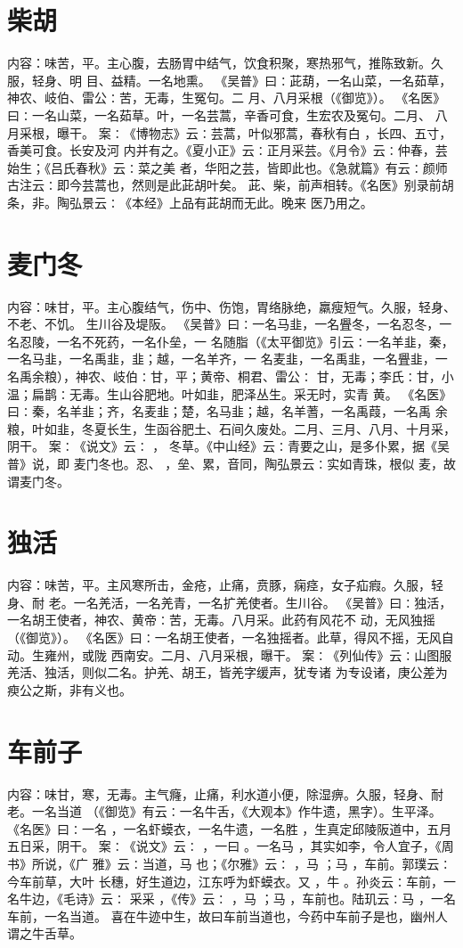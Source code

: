 \documentclass[12pt,UTF8]{ctexbook}
\begin{document}
\section{柴胡}
内容：味苦，平。主心腹，去肠胃中结气，饮食积聚，寒热邪气，推陈致新。久服，轻身、明 
目、益精。一名地熏。 
《吴普》曰∶茈葫，一名山菜，一名茹草，神农、岐伯、雷公∶苦，无毒，生冤句。二 
月、八月采根（《御览》）。 
《名医》曰∶一名山菜，一名茹草。叶，一名芸蒿，辛香可食，生宏农及冤句。二月、 
八月采根，曝干。 
案∶《博物志》云∶芸蒿，叶似邪蒿，春秋有白 ，长四、五寸，香美可食。长安及河 
内并有之。《夏小正》云∶正月采芸。《月令》云∶仲春，芸始生；《吕氏春秋》云∶菜之美 
者，华阳之芸，皆即此也。《急就篇》有云∶颜师古注云∶即今芸蒿也，然则是此茈胡叶矣。 
茈、柴，前声相转。《名医》别录前胡条，非。陶弘景云∶《本经》上品有茈胡而无此。晚来 
医乃用之。 


\section{麦门冬}
内容：味甘，平。主心腹结气，伤中、伤饱，胃络脉绝，羸瘦短气。久服，轻身、不老、不饥。 
生川谷及堤阪。 
《吴普》曰∶一名马韭，一名舋冬，一名忍冬，一名忍陵，一名不死药，一名仆垒，一 
名随脂（《太平御览》引云∶一名羊韭，秦，一名马韭，一名禹韭，韭；越，一名羊齐，一 
名麦韭，一名禹韭，一名舋韭，一名禹余粮），神农、岐伯∶甘，平；黄帝、桐君、雷公∶ 
甘，无毒；李氏∶甘，小温；扁鹊∶无毒。生山谷肥地。叶如韭，肥泽丛生。采无时，实青 
黄。 
《名医》曰∶秦，名羊韭；齐，名麦韭；楚，名马韭；越，名羊蓍，一名禹葭，一名禹 
余粮，叶如韭，冬夏长生，生函谷肥土、石间久废处。二月、三月、八月、十月采，阴干。 
案∶《说文》云∶ ， 冬草。《中山经》云∶青要之山，是多仆累，据《吴普》说，即 
麦门冬也。忍、 ，垒、累，音同，陶弘景云∶实如青珠，根似 麦，故谓麦门冬。 


\section{独活}
内容：味苦，平。主风寒所击，金疮，止痛，贲豚，痫痉，女子疝瘕。久服，轻身、耐 
老。一名羌活，一名羌青，一名扩羌使者。生川谷。 
《吴普》曰∶独活，一名胡王使者，神农、黄帝∶苦，无毒。八月采。此药有风花不 
动，无风独摇（《御览》）。 
《名医》曰∶一名胡王使者，一名独摇者。此草，得风不摇，无风自动。生雍州，或陇 
西南安。二月、八月采根，曝干。 
案∶《列仙传》云∶山图服羌活、独活，则似二名。护羌、胡王，皆羌字缓声，犹专诸 
为专设诸，庚公差为瘐公之斯，非有义也。 


\section{车前子}
内容：味甘，寒，无毒。主气癃，止痛，利水道小便，除湿痹。久服，轻身、耐老。一名当道 
（《御览》有云∶一名牛舌，《大观本》作牛遗，黑字）。生平泽。 
《名医》曰∶一名 ，一名虾蟆衣，一名牛遗，一名胜 ，生真定邱陵阪道中，五月 
五日采，阴干。 
案∶《说文》云∶ ，一曰 。一名马 ，其实如李，令人宜子，《周书》所说，《广 
雅》云∶当道，马 也；《尔雅》云∶ ，马 ；马 ，车前。郭璞云∶今车前草，大叶 
长穗，好生道边，江东呼为虾蟆衣。又 ，牛 。孙炎云∶车前，一名牛边，《毛诗》云∶ 
采采 ，《传》云∶ ，马 ；马 ，车前也。陆玑云∶马 ，一名车前，一名当道。 
喜在牛迹中生，故曰车前当道也，今药中车前子是也，幽州人谓之牛舌草。 
\end{document}
